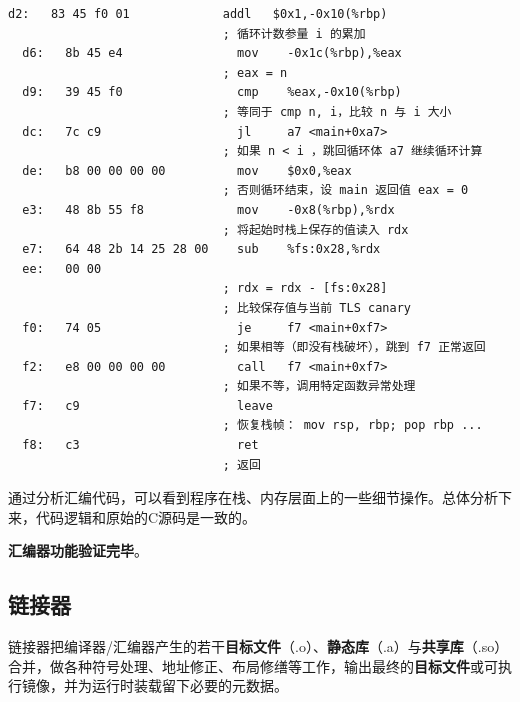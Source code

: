 \documentclass[UTF8,a4paper,10pt]{ctexart}
\begin{document}
\begin{lstlisting}[title=mainx86.o 反汇编结果与分析,frame=trbl,language={[x86masm]Assembler}]
  d2:   83 45 f0 01             addl   $0x1,-0x10(%rbp)
                              ; 循环计数参量 i 的累加
  d6:   8b 45 e4                mov    -0x1c(%rbp),%eax
                              ; eax = n 
  d9:   39 45 f0                cmp    %eax,-0x10(%rbp)
                              ; 等同于 cmp n, i，比较 n 与 i 大小
  dc:   7c c9                   jl     a7 <main+0xa7>
                              ; 如果 n < i ，跳回循环体 a7 继续循环计算
  de:   b8 00 00 00 00          mov    $0x0,%eax
                              ; 否则循环结束，设 main 返回值 eax = 0
  e3:   48 8b 55 f8             mov    -0x8(%rbp),%rdx
                              ; 将起始时栈上保存的值读入 rdx
  e7:   64 48 2b 14 25 28 00    sub    %fs:0x28,%rdx
  ee:   00 00 
                              ; rdx = rdx - [fs:0x28]
                              ; 比较保存值与当前 TLS canary
  f0:   74 05                   je     f7 <main+0xf7>
                              ; 如果相等（即没有栈破坏），跳到 f7 正常返回
  f2:   e8 00 00 00 00          call   f7 <main+0xf7>
                              ; 如果不等，调用特定函数异常处理
  f7:   c9                      leave
                              ; 恢复栈帧： mov rsp, rbp; pop rbp ...
  f8:   c3                      ret
                              ; 返回

\end{lstlisting}

通过分析汇编代码，可以看到程序在栈、内存层面上的一些细节操作。总体分析下来，代码逻辑和原始的C源码是一致的。

\vspace{1em}

\textbf{汇编器功能验证完毕}。

\vspace{1em}

\subsection{链接器}
链接器把编译器/汇编器产生的若干\textbf{目标文件}（.o）、\textbf{静态库}（.a）与\textbf{共享库}（.so）合并，做各种符号处理、地址修正、布局修缮等工作，输出最终的\textbf{目标文件}或可执行镜像，并为运行时装载留下必要的元数据。
\end{document}
